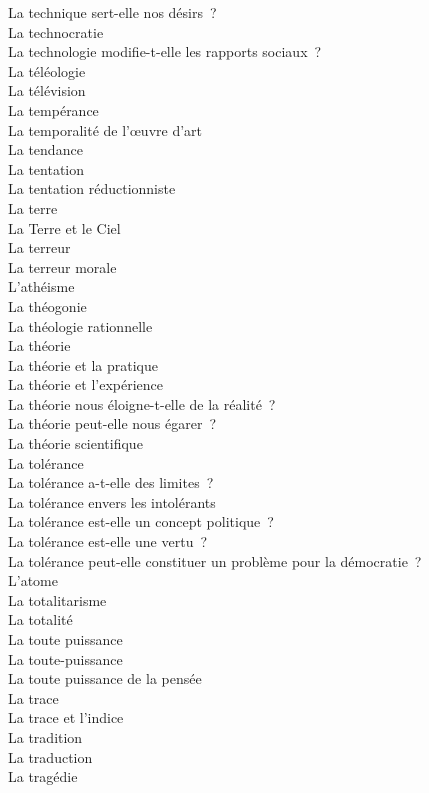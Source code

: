 \documentclass[a4paper,12pt]{article}
\begin{document}
La technique sert-elle nos désirs ? \\
La technocratie \\
La technologie modifie-t-elle les rapports sociaux ? \\
La téléologie \\
La télévision \\
La tempérance \\
La temporalité de l'œuvre d'art \\
La tendance \\
La tentation \\
La tentation réductionniste \\
La terre \\
La Terre et le Ciel \\
La terreur \\
La terreur morale \\
L'athéisme \\
La théogonie \\
La théologie rationnelle \\
La théorie \\
La théorie et la pratique \\
La théorie et l'expérience \\
La théorie nous éloigne-t-elle de la réalité ? \\
La théorie peut-elle nous égarer ? \\
La théorie scientifique \\
La tolérance \\
La tolérance a-t-elle des limites ? \\
La tolérance envers les intolérants \\
La tolérance est-elle un concept politique ? \\
La tolérance est-elle une vertu ? \\
La tolérance peut-elle constituer un problème pour la démocratie ? \\
L'atome \\
La totalitarisme \\
La totalité \\
La toute puissance \\
La toute-puissance \\
La toute puissance de la pensée \\
La trace \\
La trace et l'indice \\
La tradition \\
La traduction \\
La tragédie \\
\end{document}
